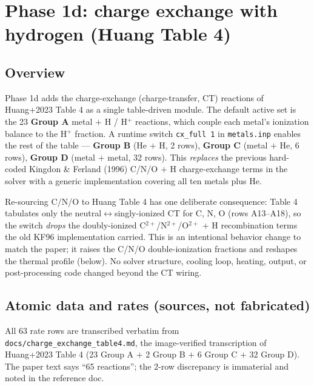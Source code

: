 \documentclass[english,a4paper]{kiseon_memo}
\begin{document}
\section{Phase 1d: charge exchange with hydrogen (Huang Table 4)}

\subsection{Overview}

Phase 1d adds the charge-exchange (charge-transfer, CT) reactions of Huang+2023
Table 4 as a single table-driven module. The default active set is the 23
\textbf{Group A} metal $+$ H / H$^+$ reactions, which couple each metal's
ionization balance to the H$^+$ fraction. A runtime switch \verb|cx_full 1| in
\texttt{metals.inp} enables the rest of the table --- \textbf{Group B} (He $+$ H,
2 rows), \textbf{Group C} (metal $+$ He, 6 rows), \textbf{Group D}
(metal $+$ metal, 32 rows). This \emph{replaces} the previous hard-coded
Kingdon \& Ferland (1996) C/N/O $+$ H charge-exchange terms in the solver with a
generic implementation covering all ten metals plus He.

Re-sourcing C/N/O to Huang Table 4 has one deliberate consequence: Table 4
tabulates only the neutral$\leftrightarrow$singly-ionized CT for C, N, O
(rows A13--A18), so the switch \emph{drops} the doubly-ionized
C$^{2+}$/N$^{2+}$/O$^{2+}$ $+$ H recombination terms the old KF96 implementation
carried. This is an intentional behavior change to match the paper; it raises the
C/N/O double-ionization fractions and reshapes the thermal profile (below). No
solver structure, cooling loop, heating, output, or post-processing code changed
beyond the CT wiring.

\subsection{Atomic data and rates (sources, not fabricated)}

All 63 rate rows are transcribed verbatim from
\texttt{docs/charge\_exchange\_table4.md}, the image-verified transcription of
Huang+2023 Table 4 (23 Group A $+$ 2 Group B $+$ 6 Group C $+$ 32 Group D). The
paper text says ``65 reactions''; the 2-row discrepancy is immaterial and noted
in the reference doc.
\end{document}
